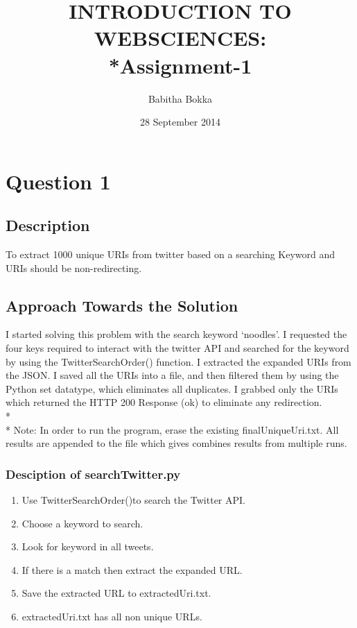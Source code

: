 \documentclass[12pt]{article}
\begin{document}
\begin{titlepage}
\title{INTRODUCTION TO WEBSCIENCES:\\*Assignment-1}
\author{Babitha Bokka}
\date{28 September 2014}
\maketitle
\end{titlepage}

\tableofcontents
\newpage
\section{Question 1}
\subsection{Description}

To extract 1000 unique URIs from twitter based on a searching Keyword and URIs should be non-redirecting.
\subsection{Approach Towards the Solution}
I started solving this problem with the search keyword `noodles'. I requested the four keys required to interact with the twitter API and searched for the keyword by using the TwitterSearchOrder() function. I extracted the expanded URIs from the JSON. I saved all the URIs into a file, and then filtered them by using the Python set datatype, which eliminates all duplicates. I grabbed only the URIs which returned the HTTP 200 Response (ok) to eliminate any redirection.
\\*\\*
Note: In order to run the program, erase the existing finalUniqueUri.txt. All results are appended to the file which gives combines results from multiple runs.

\subsubsection{Desciption of searchTwitter.py}
\begin{enumerate}
	\item Use TwitterSearchOrder()to search the Twitter API.
	\item Choose a keyword to search.
	\item Look for keyword in all tweets.
	\item If there is a match then extract the expanded URL.
	\item Save the extracted URL to extractedUri.txt.
	\item extractedUri.txt has all non unique URLs.
\end{enumerate}
\end{document}
